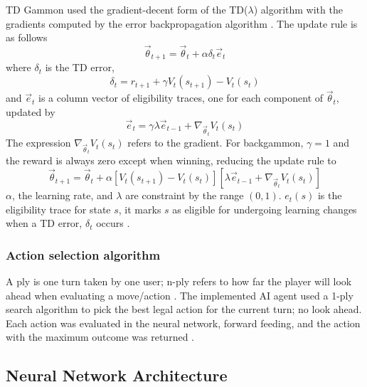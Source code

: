 \documentclass[12pt,a4paper]{article}
\begin{document}
TD Gammon used the gradient-decent form of the TD($\lambda$) algorithm with the gradients computed by the error backpropagation algorithm \cite{rl}. The update rule is as follows
$$\vec{\theta}_{t+1} = \vec{\theta}_{t} + \alpha\delta_t\vec{e}_{t}$$ 
where $\delta_t$ is the TD error,
$$\delta_{t} = r_{t+1} + \gamma V_t(s_{t+1}) - V_t(s_t)$$ 
and $\vec{e}_t$ is a column vector of eligibility traces, one for each component of $\vec{\theta}_t$, updated by 
$$\vec{e}_{t} = \gamma\lambda\vec{e}_{t-1} + \nabla_{\vec{\theta}_{t}}V_t(s_t)$$ 
The expression $\nabla_{\vec{\theta}_{t}}V_t(s_t)$ refers to the gradient. For backgammon, $\gamma=1$ and the reward is always zero except when winning, reducing the update rule to
$$\vec{\theta}_{t+1} = \vec{\theta}_{t} + \alpha[V_t(s_{t+1}) - V_t(s_t)][\lambda\vec{e}_{t-1} + \nabla_{\vec{\theta}_{t}}V_t(s_t)]$$
$\alpha$, the learning rate, and $\lambda$ are constraint by the range $(0,1)$. $e_t(s)$ is the eligibility trace for state $s$, it marks $s$ as eligible for undergoing learning changes when a TD error, $\delta_t$ occurs \cite{rl}.

\subsubsection{Action selection algorithm}
A ply is one turn taken by one user; n-ply refers to how far the player will look ahead when evaluating a move/action \cite{glossary}. The implemented AI agent used a 1-ply search algorithm to pick the best legal action for the current turn; no look ahead. Each action was evaluated in the neural network, forward feeding, and the action with the maximum outcome was returned \cite{DBLP:conf/icml/Tesauro92}. 

\subsection{Neural Network Architecture}
\end{document}
